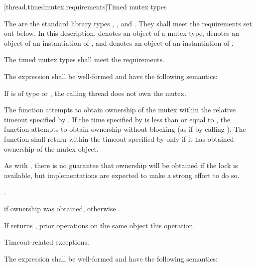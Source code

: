 [thread.timedmutex.requirements]{Timed mutex types}

\pnum
The  are the standard library types ,
, and . They shall
meet the requirements set out below.
In this description,  denotes an object of a mutex type,
 denotes an object of an
instantiation of , and  denotes an
object of an
instantiation of .

\pnum
The timed mutex types shall meet the 
requirements.

\pnum
The expression  shall be well-formed and have the
following semantics:

\begin{itemdescr}
\pnum
\requires If  is of type  or
, the calling thread does not
own the mutex.

\pnum
\effects The function attempts to obtain ownership of the mutex within the
relative timeout
specified by . If the time specified by  is less than or
equal to , the function attempts to obtain ownership without blocking (as if by calling
). The function shall return within the timeout specified by
 only if it has obtained ownership of the mutex object. \begin{note} As
with , there is no guarantee that ownership will be obtained if the
lock is available, but implementations are expected to make a strong effort to do so.
\end{note}

\pnum
\returntype {}.

\pnum
\returns {} if ownership was obtained, otherwise .

\pnum
\sync If  returns , prior  operations
on the same object  this operation.

\pnum\throws Timeout-related exceptions.
\end{itemdescr}

\pnum
The expression  shall be well-formed and have the
following semantics:

